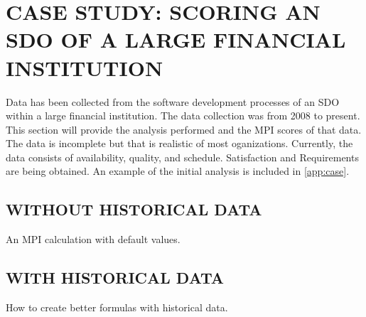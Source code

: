 \documentclass[SDSUThesis.tex]{subfiles}
\begin{document}
\section{CASE STUDY: SCORING AN SDO OF A LARGE FINANCIAL INSTITUTION}

Data has been collected from the software development processes of
an SDO within a large financial institution.
The data collection was from 2008 to present. This section will provide the analysis performed and the MPI scores of that data. The data is incomplete but that is realistic of most oganizations.  Currently, the data
consists of availability, quality, and schedule.  Satisfaction and Requirements are being obtained. An example of the initial analysis is included in \cref{app:case}.

\subsection{WITHOUT HISTORICAL DATA}

An MPI calculation with default values.

\subsection{WITH HISTORICAL DATA}

How to create better formulas with historical data.

  
\end{document}
